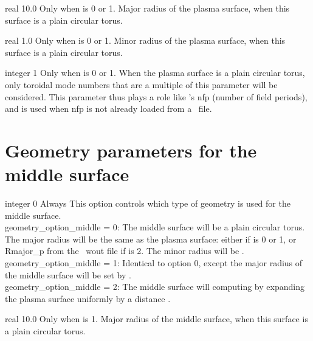\myhrule

{real}
{10.0}
{Only when  is 0 or 1.}
{Major radius of the plasma surface, when this surface is a plain circular torus.}

\myhrule

{real}
{1.0}
{Only when  is 0 or 1.}
{Minor radius of the plasma surface, when this surface is a plain circular torus.}

\myhrule

{integer}
{1}
{Only when  is 0 or 1.}
{When the plasma surface is a plain circular torus, only toroidal mode numbers that are a multiple of this parameter will be considered.
This parameter thus plays a role like \vmec's {\ttfamily nfp} (number of field periods),
and is used when {\ttfamily nfp} is not already loaded from a \vmec~file.}

\section{Geometry parameters for the middle surface}

{integer}
{0}
{Always}
{This option controls which type of geometry is used for the middle surface.\\

{\ttfamily geometry\_option\_middle} = 0: The middle surface will be a plain circular torus. The major radius will be the 
same as the plasma surface: either  if  is 0 or 1, or {\ttfamily Rmajor\_p} from the \vmec~{\ttfamily wout} file
if   is 2.
     The minor radius will be .\\

{\ttfamily geometry\_option\_middle} = 1: Identical to option 0, except the major radius of the middle surface will be set by .\\

{\ttfamily geometry\_option\_middle} = 2: The middle surface will computing by expanding the plasma surface uniformly by a distance .
}

\myhrule

{real}
{10.0}
{Only when  is 1.}
{Major radius of the middle surface, when this surface is a plain circular torus.}

